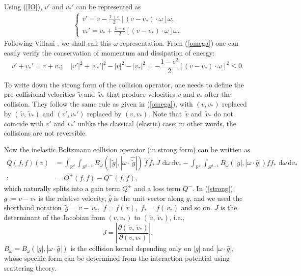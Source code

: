 \documentclass[review, times]{elsarticle}
\newcommand{\rd}{\,\mathrm{d}}
\newcommand{\tv}{\,\tilde{v}}
\newcommand{\tg}{\,\tilde{g}}
\newcommand{\tf}{\,\tilde{f}}
\begin{document}
Using (\ref{IO}), $v'$ and $v_*'$ can be represented as
\begin{align}\label{omega}
\left\{
\begin{array}{l}
\displaystyle v'=v-\frac{1+e}{2}[(v-v_*)\cdot \omega ]\omega, \\[8pt]
\displaystyle v_*'=v_*+\frac{1+e}{2}[(v-v_*)\cdot \omega]\omega.
\end{array}\right.
\end{align}
Following Villani \cite{Villani02}, we shall call this $\omega$-representation. From (\ref{omega}) one can easily verify the conservation of momentum and dissipation of energy:
\begin{equation} \label{momentum}
v'+v_*'=v+v_*; \quad |v'|^2+|v_*'|^2-|v|^2-|v_*|^2=-\frac{1-e^2}{2}[(v-v_*)\cdot \omega]^2\leq 0.
\end{equation}

To write down the strong form of the collision operator, one needs to define the pre-collisional velocities $\tv$ and $\tv_*$ that produce velocities $v$ and $v_*$ after the collision. They follow the same rule as given in (\ref{omega}), with $(v,v_*)$ replaced by $(\tv, \tv_*)$ and $(v',v_*')$ replaced by $(v,v_*)$. Note that $\tv$ and $\tv_*$ do not coincide with $v'$ and $v_*'$ unlike the classical (elastic) case; in other words, the collisions are not reversible. 

Now the inelastic Boltzmann collision operator (in strong form) can be written as
\begin{align} \label{strong}
Q(f,f)(v)&=\int_{\mathbb{R}^d}\int_{S^{d-1}}B_{\omega}(|\tg|,|\omega\cdot  \hat{\tg}|) \tf\tf_*\,J\,\rd{\omega}\rd{v_*}-\int_{\mathbb{R}^d}\int_{S^{d-1}}B_{\omega}(|g|,|\omega\cdot \hat{g}|)ff_*\,\rd{\omega}\rd{v_*}\nonumber\\
:&=Q^+(f,f)-Q^-(f,f),
\end{align}
which naturally splits into a gain term $Q^+$ and a loss term $Q^-$. In (\ref{strong}), $g:=v-v_*$ is the relative velocity, $\hat{g}$ is the unit vector along $g$, and we used the shorthand notation $\tg=\tv-\tv_*$, $\tf=f(\tv)$, $\tf_*=f(\tv_*)$ and so on. $J$ is the determinant of the Jacobian from $(v,v_*)$ to $(\tv,\tv_*)$, i.e.,
\begin{equation}
J=\left |  \frac{\partial (\tv,\tv_*)}{\partial (v,v_*)}     \right|.
\end{equation}
$B_{\omega}=B_{\omega}(|g|,|\omega\cdot \hat{g}|)$ is the collision kernel depending only on $|g|$ and $|\omega\cdot \hat{g}|$, whose specific form can be determined from the interaction potential using scattering theory. %
\end{document}
